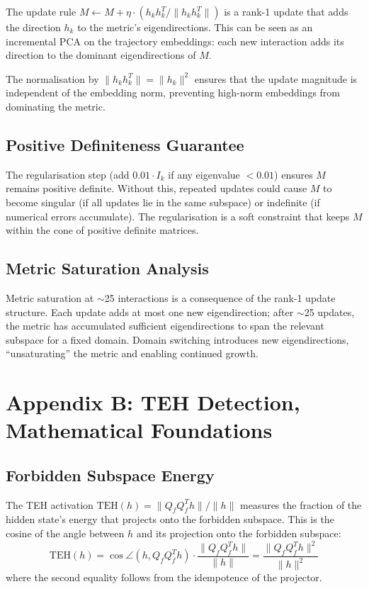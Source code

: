 \documentclass[11pt]{article}
\begin{document}
The update rule $M \leftarrow M + \eta \cdot (h_k h_k^T / \|h_k h_k^T\|)$ is a rank-1 update that adds the direction $h_k$ to the metric's eigendirections. This can be seen as an incremental PCA on the trajectory embeddings: each new interaction adds its direction to the dominant eigendirections of $M$.

The normalisation by $\|h_k h_k^T\| = \|h_k\|^2$ ensures that the update magnitude is independent of the embedding norm, preventing high-norm embeddings from dominating the metric.

\subsection{Positive Definiteness Guarantee}

The regularisation step (add $0.01 \cdot I_k$ if any eigenvalue $< 0.01$) ensures $M$ remains positive definite. Without this, repeated updates could cause $M$ to become singular (if all updates lie in the same subspace) or indefinite (if numerical errors accumulate). The regularisation is a soft constraint that keeps $M$ within the cone of positive definite matrices.

\subsection{Metric Saturation Analysis}

Metric saturation at $\sim$25 interactions is a consequence of the rank-1 update structure. Each update adds at most one new eigendirection; after $\sim$25 updates, the metric has accumulated sufficient eigendirections to span the relevant subspace for a fixed domain. Domain switching introduces new eigendirections, ``unsaturating'' the metric and enabling continued growth.


\section{Appendix B: TEH Detection, Mathematical Foundations}

\subsection{Forbidden Subspace Energy}

The TEH activation $\mathrm{TEH}(h) = \|Q_f Q_f^T h\| / \|h\|$ measures the fraction of the hidden state's energy that projects onto the forbidden subspace. This is the cosine of the angle between $h$ and its projection onto the forbidden subspace:
\begin{equation}
\mathrm{TEH}(h) = \cos \angle(h, Q_f Q_f^T h) \cdot \frac{\|Q_f Q_f^T h\|}{\|h\|} = \frac{\|Q_f Q_f^T h\|^2}{\|h\|^2}
\end{equation}
where the second equality follows from the idempotence of the projector.
\end{document}
